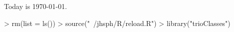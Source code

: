 \documentclass[10pt]{article}
\begin{document}
\setlength{\parskip}{0.2\baselineskip}
\setlength{\parindent}{0pt}
Today is \today.
\begin{Schunk}
\begin{Sinput}
> rm(list = ls())
> source("~/jhsph/R/reload.R")
> library("trioClasses")
\end{Sinput}
\end{Schunk}
\end{document}
